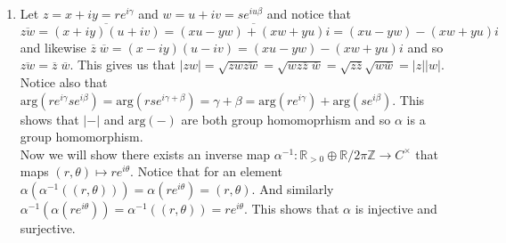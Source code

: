 \documentclass[12pt]{amsart}
\theoremstyle{definition}
\newcommand{\R}{\mathbb{R}}
\newcommand{\Z}{\mathbb{Z}}
\newcommand{\ra}{\rightarrow}
\begin{document}
\begin{enumerate}
\item Let $z=x+iy=re^{i\gamma}$ and $w=u+iv=se^{iu\beta}$ and notice that $\overline{zw}=\overline{(x+iy)(u+iv)}=\overline{(xu-yw)+(xw+yu)i}=(xu-yw)-(xw+yu)i$ and likewise $\overline{z}\;\overline{w}=(x-iy)(u-iv)=(xu-yw)-(xw+yu)i$ and so $\overline{zw}=\overline{z}\;\overline{w}$. This gives us that $|zw|=\sqrt{zw\overline{zw}}=\sqrt{wz\overline{z}\;\overline{w}}=\sqrt{z\overline{z}}\sqrt{w\overline{w}}=|z||w|$.\\ Notice also that $\text{arg}(re^{i\gamma}se^{i\beta})=\text{arg}(rse^{i\gamma+\beta})=\gamma+\beta=\text{arg}(re^{i\gamma})+\text{arg}(se^{i\beta})$. This shows that $|-|$ and $\text{arg}(-)$ are both group homomoprhism and so $\alpha$ is a group homomorphism.\\

Now we will show there exists an inverse map $\alpha^{-1}:\R_{>0}\oplus \R/2\pi\Z\ra C^\times$ that maps $(r,\theta)\mapsto re^{i\theta}$. Notice that for an element  $\alpha(\alpha^{-1}((r,\theta)))=\alpha(re^{i\theta})=(r,\theta)$. And similarly $\alpha^{-1}(\alpha(re^{i\theta}))=\alpha^{-1}((r,\theta))=re^{i\theta}$. This shows that $\alpha$ is injective and surjective.\\

\end{enumerate}
\end{document}
